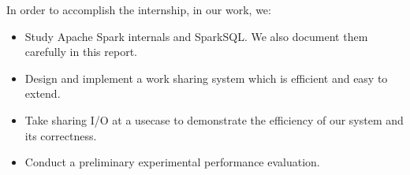 In order to accomplish the internship, in our work, we:\\	
\begin{itemize}
\item Study Apache Spark internals and SparkSQL. We also document them carefully in this report.
\item Design and implement a work sharing system which is efficient and easy to extend.
\item Take sharing I/O at a usecase to demonstrate the efficiency of our system and its correctness.
\item Conduct a preliminary experimental performance evaluation.
\end{itemize}



